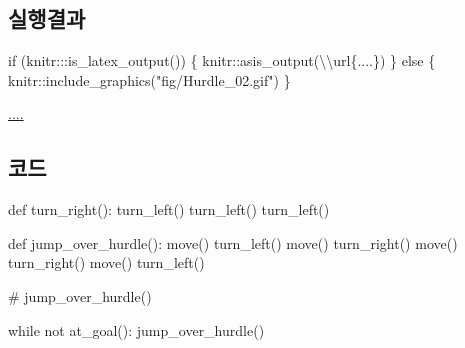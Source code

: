 \documentclass[
  b5paperpaper,
  DIV=11,
  numbers=noendperiod]{scrreprt}
\newenvironment{Shaded}{\begin{snugshade}}{\end{snugshade}}
\newcommand{\CommentTok}[1]{\textcolor[rgb]{0.37,0.37,0.37}{#1}}
\newcommand{\ControlFlowTok}[1]{\textcolor[rgb]{0.00,0.23,0.31}{#1}}
\newcommand{\FunctionTok}[1]{\textcolor[rgb]{0.28,0.35,0.67}{#1}}
\newcommand{\NormalTok}[1]{\textcolor[rgb]{0.00,0.23,0.31}{#1}}
\newcommand{\SpecialCharTok}[1]{\textcolor[rgb]{0.37,0.37,0.37}{#1}}
\newcommand{\StringTok}[1]{\textcolor[rgb]{0.13,0.47,0.30}{#1}}
\begin{document}
\hypertarget{uxc2e4uxd589uxacb0uxacfc-12}{%
\subsection{실행결과}\label{uxc2e4uxd589uxacb0uxacfc-12}}

\begin{Shaded}
\begin{Highlighting}[]
\ControlFlowTok{if}\NormalTok{ (knitr}\SpecialCharTok{:::}\FunctionTok{is\_latex\_output}\NormalTok{()) \{}
\NormalTok{  knitr}\SpecialCharTok{::}\FunctionTok{asis\_output}\NormalTok{(}\StringTok{\textquotesingle{}}\SpecialCharTok{\textbackslash{}\textbackslash{}}\StringTok{url\{....\}\textquotesingle{}}\NormalTok{)}
\NormalTok{\} }\ControlFlowTok{else}\NormalTok{ \{}
\NormalTok{  knitr}\SpecialCharTok{::}\FunctionTok{include\_graphics}\NormalTok{(}\StringTok{"fig/Hurdle\_02.gif"}\NormalTok{)}
\NormalTok{\}}
\end{Highlighting}
\end{Shaded}

\url{....}

\hypertarget{uxcf54uxb4dc-12}{%
\subsection{코드}\label{uxcf54uxb4dc-12}}

\begin{Shaded}
\begin{Highlighting}[]
\NormalTok{def }\FunctionTok{turn\_right}\NormalTok{()}\SpecialCharTok{:}
    \FunctionTok{turn\_left}\NormalTok{()}
    \FunctionTok{turn\_left}\NormalTok{()}
    \FunctionTok{turn\_left}\NormalTok{()}

\NormalTok{def }\FunctionTok{jump\_over\_hurdle}\NormalTok{()}\SpecialCharTok{:}    
    \FunctionTok{move}\NormalTok{()}
    \FunctionTok{turn\_left}\NormalTok{()}
    \FunctionTok{move}\NormalTok{()}
    \FunctionTok{turn\_right}\NormalTok{()}
    \FunctionTok{move}\NormalTok{()}
    \FunctionTok{turn\_right}\NormalTok{()}
    \FunctionTok{move}\NormalTok{()}
    \FunctionTok{turn\_left}\NormalTok{()}

\CommentTok{\# jump\_over\_hurdle()    }

\ControlFlowTok{while}\NormalTok{ not }\FunctionTok{at\_goal}\NormalTok{()}\SpecialCharTok{:}
    \FunctionTok{jump\_over\_hurdle}\NormalTok{()}
\end{Highlighting}
\end{Shaded}
\end{document}
